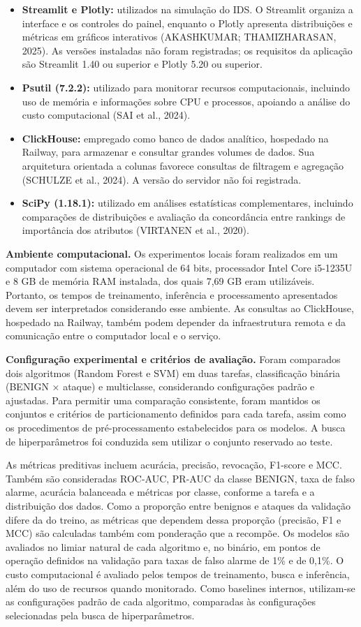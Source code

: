 \documentclass[
    12pt,                %
    openright,           %
    oneside,             %
    a4paper,             %
    english,             %
    brazil               %
]{abntex2}
\begin{document}
\begin{itemize}
\item
  \textbf{Streamlit e Plotly:} utilizados na simulação do IDS. O Streamlit organiza a interface e os controles do painel, enquanto o Plotly apresenta distribuições e métricas em gráficos interativos (AKASHKUMAR; THAMIZHARASAN, 2025). As versões instaladas não foram registradas; os requisitos da aplicação são Streamlit 1.40 ou superior e Plotly 5.20 ou superior.
\item
  \textbf{Psutil (7.2.2):} utilizado para monitorar recursos computacionais, incluindo uso de memória e informações sobre CPU e processos, apoiando a análise do custo computacional (SAI et al., 2024).
\item
  \textbf{ClickHouse:} empregado como banco de dados analítico, hospedado na Railway, para armazenar e consultar grandes volumes de dados. Sua arquitetura orientada a colunas favorece consultas de filtragem e agregação (SCHULZE et al., 2024). A versão do servidor não foi registrada.
\item
  \textbf{SciPy (1.18.1):} utilizado em análises estatísticas complementares, incluindo comparações de distribuições e avaliação da concordância entre rankings de importância dos atributos (VIRTANEN et al., 2020).
\end{itemize}

\textbf{Ambiente computacional.} Os experimentos locais foram realizados em um computador com sistema operacional de 64 bits, processador Intel Core i5-1235U e 8 GB de memória RAM instalada, dos quais 7,69 GB eram utilizáveis. Portanto, os tempos de treinamento, inferência e processamento apresentados devem ser interpretados considerando esse ambiente. As consultas ao ClickHouse, hospedado na Railway, também podem depender da infraestrutura remota e da comunicação entre o computador local e o serviço.

\textbf{Configuração experimental e critérios de avaliação.} Foram comparados dois algoritmos (Random Forest e SVM) em duas tarefas, classificação binária (BENIGN × ataque) e multiclasse, considerando configurações padrão e ajustadas. Para permitir uma comparação consistente, foram mantidos os conjuntos e critérios de particionamento definidos para cada tarefa, assim como os procedimentos de pré-processamento estabelecidos para os modelos. A busca de hiperparâmetros foi conduzida sem utilizar o conjunto reservado ao teste.

As métricas preditivas incluem acurácia, precisão, revocação, F1-score e MCC. Também são consideradas ROC-AUC, PR-AUC da classe BENIGN, taxa de falso alarme, acurácia balanceada e métricas por classe, conforme a tarefa e a distribuição dos dados. Como a proporção entre benignos e ataques da validação difere da do treino, as métricas que dependem dessa proporção (precisão, F1 e MCC) são calculadas também com ponderação que a recompõe. Os modelos são avaliados no limiar natural de cada algoritmo e, no binário, em pontos de operação definidos na validação para taxas de falso alarme de 1\% e de 0,1\%. O custo computacional é avaliado pelos tempos de treinamento, busca e inferência, além do uso de recursos quando monitorado. Como baselines internos, utilizam-se as configurações padrão de cada algoritmo, comparadas às configurações selecionadas pela busca de hiperparâmetros.
\end{document}

